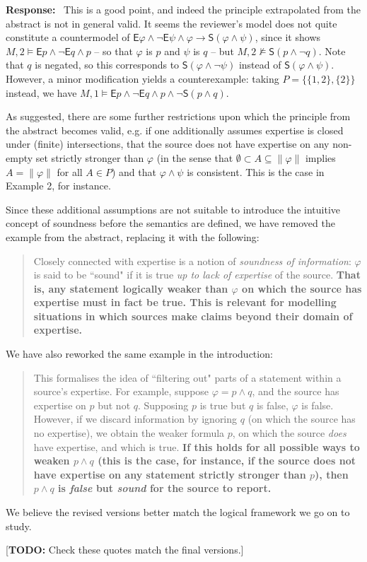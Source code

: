 \documentclass[12pt]{article}
\newcommand\todo[1]{{\color{red} [\textbf{TODO:} {#1}]}}
\newenvironment{response}{
    \noindent\textbf{Response:}\
}{\vspace{5mm}}
\renewcommand{\phi}{\varphi}
\newcommand{\E}{\mathsf{E}}
\renewcommand{\S}{\mathsf{S}}
\begin{document}
\begin{response}
    This is a good point, and indeed the principle extrapolated from the
    abstract is not in general valid. It seems the reviewer's model does not
    quite constitute a countermodel of $\E\phi \land \neg\E\psi \land \phi
    \rightarrow \S(\phi \land \psi)$, since it shows $M, 2 \models \E{p} \land
    \neg\E{q} \land p$ -- so that $\phi$ is $p$ and $\psi$ is $q$ -- but $M, 2
    \not\models \S(p \land \neg{q})$. Note that $q$ is negated, so this
    corresponds to $\S(\phi \land \neg\psi)$ instead of $\S(\phi \land \psi)$.
    However, a minor modification yields a counterexample: taking $P = \{\{1,
    2\}, \{2\}\}$ instead, we have $M, 1 \models \E{p} \land \neg\E{q} \land p
    \land \neg\S(p \land q)$.

    As suggested, there are some further restrictions upon which the principle
    from the abstract becomes valid, e.g. if one additionally assumes expertise
    is closed under (finite) intersections, that the source does not have
    expertise on any non-empty set strictly stronger than $\phi$ (in the sense
    that $\emptyset \subset A \subseteq \|\phi\|$ implies $A = \|\phi\|$ for
    all $A \in P$) and that $\phi \land \psi$ is consistent. This is the case
    in Example 2, for instance.

    Since these additional assumptions are not suitable to introduce the
    intuitive concept of soundness before the semantics are defined, we have
    removed the example from the abstract, replacing it with the following:

    \begin{quotation}
        Closely connected with expertise is a notion of \emph{soundness of
        information}: $\phi$ is said to be ``sound" if it is true \emph{up to
        lack of expertise} of the source. \textbf{That is, any statement
        logically weaker than $\phi$ on which the source has expertise must in
        fact be true. This is relevant for modelling situations in which
        sources make claims beyond their domain of expertise.}
    \end{quotation}

    We have also reworked the same example in the introduction:

    \begin{quotation}
        This formalises the idea of ``filtering out" parts of a statement
        within a source's expertise. For example, suppose $\phi = p \land q$,
        and the source has expertise on $p$ but not $q$. Supposing $p$ is true
        but $q$ is false, $\phi$ is false. However, if we discard information
        by ignoring $q$ (on which the source has no expertise), we obtain the
        weaker formula $p$, on which the source \emph{does} have expertise, and
        which is true. \textbf{If this holds for all possible ways to weaken $p
        \land q$ (this is the case, for instance, if the source does not have
        expertise on any statement strictly stronger than $p$), then $p \land
        q$ is \emph{false} but \emph{sound} for the source to report.}
    \end{quotation}

    We believe the revised versions better match the logical framework we go on
    to study.

    \todo{Check these quotes match the final versions.}
\end{response}
\end{document}
